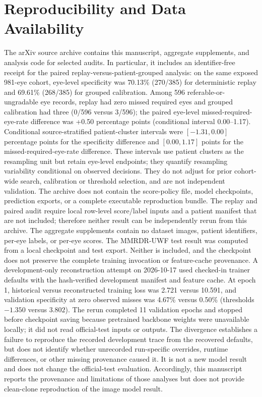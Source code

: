 \documentclass[11pt]{article}
\begin{document}
\section{Reproducibility and Data Availability}
The arXiv source archive contains this manuscript, aggregate supplements, and analysis code for selected audits. In particular, it includes an identifier-free receipt for the paired replay-versus-patient-grouped analysis: on the same exposed 981-eye cohort, eye-level specificity was 70.13\% (270/385) for deterministic replay and 69.61\% (268/385) for grouped calibration. Among 596 referable-or-ungradable eye records, replay had zero missed required eyes and grouped calibration had three (0/596 versus 3/596); the paired eye-level missed-required-eye-rate difference was +0.50 percentage points (conditional interval 0.00--1.17). Conditional source-stratified patient-cluster intervals were $[-1.31,0.00]$ percentage points for the specificity difference and $[0.00,1.17]$ points for the missed-required-eye-rate difference. These intervals use patient clusters as the resampling unit but retain eye-level endpoints; they quantify resampling variability conditional on observed decisions. They do not adjust for prior cohort-wide search, calibration or threshold selection, and are not independent validation. The archive does not contain the score-policy file, model checkpoints, prediction exports, or a complete executable reproduction bundle. The replay and paired audit require local row-level score/label inputs and a patient manifest that are not included; therefore neither result can be independently rerun from this archive. The aggregate supplements contain no dataset images, patient identifiers, per-eye labels, or per-eye scores. The MMRDR-UWF test result was computed from a local checkpoint and test export. Neither is included, and the checkpoint does not preserve the complete training invocation or feature-cache provenance. A development-only reconstruction attempt on 2026-10-17 used checked-in trainer defaults with the hash-verified development manifest and feature cache. At epoch 1, historical versus reconstructed training loss was 2.721 versus 10.591, and validation specificity at zero observed misses was 4.67\% versus 0.50\% (thresholds $-1.350$ versus $3.802$). The rerun completed 11 validation epochs and stopped before checkpoint saving because pretrained backbone weights were unavailable locally; it did not read official-test inputs or outputs. The divergence establishes a failure to reproduce the recorded development trace from the recovered defaults, but does not identify whether unrecorded run-specific overrides, runtime differences, or other missing provenance caused it. It is not a new model result and does not change the official-test evaluation. Accordingly, this manuscript reports the provenance and limitations of those analyses but does not provide clean-clone reproduction of the image model result.
\end{document}

